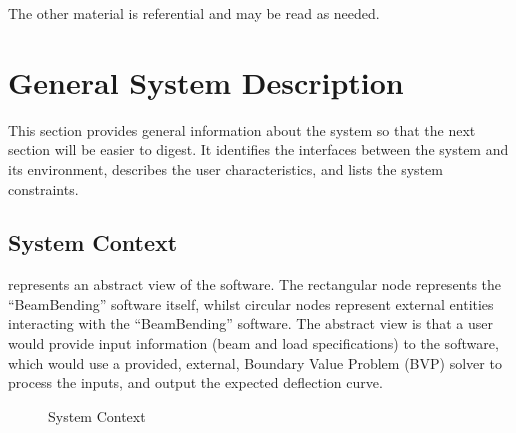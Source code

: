 \documentclass[12pt]{article}
\begin{document}
The other material is referential and may be read as needed.

\newpage


\section{General System Description}
\label{sec_gsd}

This section provides general information about the system so that the next
section will be easier to digest. It identifies the interfaces between the
system and its environment, describes the user characteristics, and lists the
system constraints.

\subsection{System Context}

 represents an abstract view of the software. The
rectangular node represents the ``BeamBending'' software itself, whilst circular
nodes represent external entities interacting with the ``BeamBending'' software.
The abstract view is that a user would provide input information (beam and load
specifications) to the software, which would use a provided, external, Boundary
Value Problem (BVP) solver to process the inputs, and output the expected
deflection curve.

\begin{figure}[h!]
    \begin{center}
    \end{center}
    \caption{System Context}
    \label{Fig_SystemContext}
\end{figure}
\end{document}
